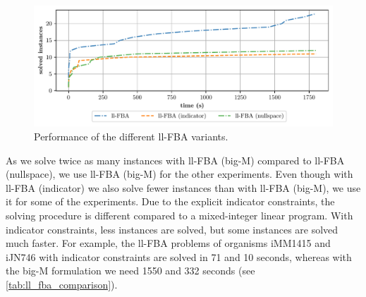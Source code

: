 \begin{figure}[h!]
    \centering
    \includegraphics[width=1.0\textwidth]{Images/fba_variants_comparison_plot.pdf}
    \caption{\label{fig:ll_fba_comparison} Performance of the different \textsf{ll-FBA} variants.}
\end{figure}

\enlargethispage{\baselineskip}
As we solve twice as many instances with \textsf{ll-FBA (big-M)} compared to \textsf{ll-FBA (nullspace)}, we use \textsf{ll-FBA (big-M)} for the other experiments. Even though with \textsf{ll-FBA (indicator)} we also solve fewer instances than with \textsf{ll-FBA (big-M)}, we use it for some of the experiments. Due to the explicit indicator constraints, the solving procedure is different compared to a mixed-integer linear program. With indicator constraints, less instances are solved, but some instances are solved much faster. For example, the ll-FBA problems of organisms \textsf{iMM1415} and \textsf{iJN746} with indicator constraints are solved in 71 and 10 seconds, whereas with the big-M formulation we need 1550 and 332 seconds (see \cref{tab:ll_fba_comparison}). 

\newpage
